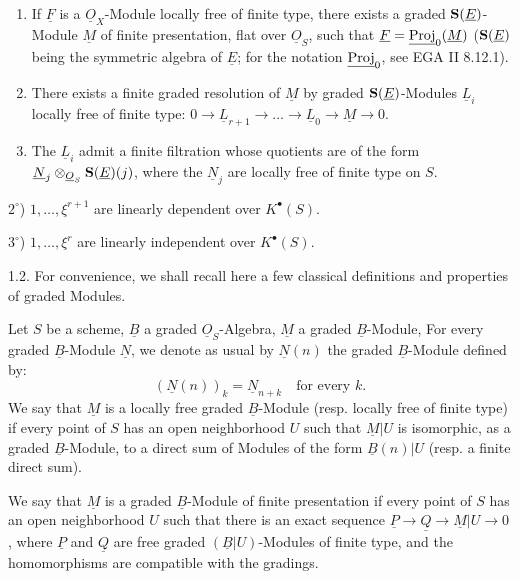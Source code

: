 \begin{enumerate}[label=\alph*)]
\item If \(\underline{F}\) is a \(\underline{O}_X\)-Module locally free of finite type, there exists a graded \(\mathbf{S}(\underline{E})\)-Module \(\underline{M}\) of finite presentation, flat over \(\underline{O}_S\), such that \(\underline{F}=\underline{\operatorname{Proj}}_0(\underline{M})\) (\(\mathbf{S}(\underline{E})\) being the symmetric algebra of \(\underline{E}\); for the notation \(\underline{\operatorname{Proj}}_0\), see EGA II 8.12.1).

\item There exists a finite graded resolution of \(\underline{M}\) by graded \(\mathbf{S}(\underline{E})\)-Modules \(\underline{L}_i\) locally free of finite type: \(0\longrightarrow \underline{L}_{r+1}\longrightarrow\ldots\longrightarrow \underline{L}_0\longrightarrow \underline{M}\longrightarrow 0\).

\item The \(\underline{L}_i\) admit a finite filtration whose quotients are of the form \(\underline{N}_j\otimes_{\underline{O}_S}\mathbf{S}(\underline{E})(j)\), where the \(\underline{N}_j\) are locally free of finite type on \(S\).
\end{enumerate}

%
\(2^\circ\)) \(1,\ldots,\xi^{r+1}\) are linearly dependent over \(K^{\bullet}(S)\).

\(3^\circ\)) \(1,\ldots,\xi^r\) are linearly independent over \(K^{\bullet}(S)\).

1.2.
For convenience, we shall recall here a few classical definitions and properties of graded Modules.

Let \(S\) be a scheme, \(\underline{B}\) a graded \(\underline{O}_S\)-Algebra, \(\underline{M}\) a graded \(\underline{B}\)-Module, For every graded \(\underline{B}\)-Module \(\underline{N}\), we denote as usual by \(\underline{N}(n)\) the graded \(\underline{B}\)-Module defined by:
\[
  (\underline{N}(n))_k=\underline{N}_{n+k}\quad\text{for every }k.
\]
We say that \(\underline{M}\) is a locally free graded \(\underline{B}\)-Module (resp. locally free of finite type) if every point of \(S\) has an open neighborhood \(U\) such that \(\underline{M}|U\) is isomorphic, as a graded \(\underline{B}\)-Module, to a direct sum of Modules of the form \(\underline{B}(n)|U\) (resp. a finite direct sum).

We say that \(\underline{M}\) is a graded \(\underline{B}\)-Module of finite presentation if every point of \(S\) has an open neighborhood \(U\) such that there is an exact sequence \(\underline{P}\longrightarrow \underline{Q}\longrightarrow \underline{M}|U\longrightarrow 0\), where \(\underline{P}\) and \(\underline{Q}\) are free graded \((\underline{B}|U)\)-Modules of finite type, and the homomorphisms are compatible with the gradings.


